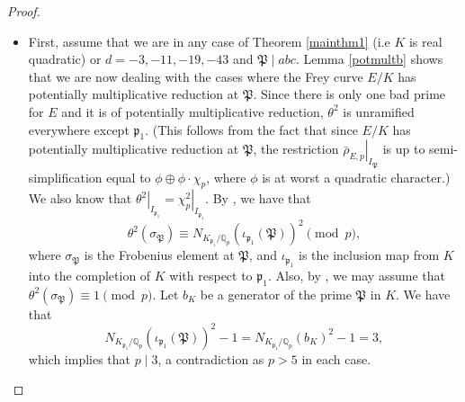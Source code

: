\documentclass[]{article}
\newcommand {\mfp}{{\mathfrak{P}}}
\newcounter{cases}
\begin{document}
\begin{proof}
\begin{enumerate}
\begin{itemize}
    \item First, assume that we are in any case of Theorem \ref{mainthm1} (i.e $K$ is real quadratic) or $d=-3,-11,-19,-43$ and $\mfp\mid abc$. Lemma \ref{potmultb} shows that we are now dealing with the cases where the Frey curve $E/K$ has potentially multiplicative reduction at $\mfp$. Since there is only one bad prime for $E$ and it is of potentially multiplicative reduction, $\theta^2$ is unramified everywhere except $\mathfrak{p}_1$. (This follows from the fact that since $E/K$ has potentially multiplicative reduction at $\mfp$, the restriction $\left.\bar{\rho}_{E, p}\right|_{I_{\mfp}}$ is up to semi-simplification equal to $\phi \oplus \phi\cdot\chi_p$, where $\phi$ is at worst a quadratic character.) We also know that $\left.\theta^2\right|_{I_{\mathfrak{p}_1}}=\left.\chi_p^2\right|_{I_{\mathfrak{p}_1}}$. By \cite[Lemma 4.3]{cturcacs2018fermat}, we have that
$$
\theta^2\left(\sigma_{\mfp}\right) \equiv N_{K_{\mathfrak{p}_1} / \mathbb{Q}_p}\left(\iota_{\mathfrak{p}_1}(\mfp)\right)^2 \pmod p,
$$where $\sigma_{\mfp}$ is the Frobenius element at $\mfp$, and $\iota_{\mathfrak{p}_1}$ is the inclusion map from $K$ into the completion of $K$ with respect to $\mathfrak{p}_1$. Also, by \cite[Lemma 6.3]{csengun2018asymptotic}, we may assume that $\theta^2\left(\sigma_{\mfp}\right) \equiv 1\pmod p$. Let $b_K$ be a generator of the prime $\mfp$ in $K$. We have that
$$
N_{K_{\mathfrak{p}_1} / \mathbb{Q}_p}\left(\iota_{\mathfrak{p}_1}(\mfp)\right)^2-1=N_{K_{\mathfrak{p}_1} / \mathbb{Q}_p}\left(b_K\right)^2-1
=3,
$$which implies that $p\mid3$, a contradiction as $p> 5$ in each case.

\end{itemize}
\end{enumerate}
\end{proof}
\end{document}

